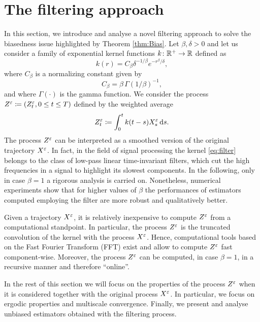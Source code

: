 \documentclass[10pt]{article}
\begin{document}
\section{The filtering approach}\label{sec:Filter}

In this section, we introduce and analyse a novel filtering approach to solve the biasedness issue highlighted by Theorem \ref{thm:Bias}. Let $\beta, \delta > 0$ and let us consider a family of exponential kernel functions $k \colon \mathbb{R}^+ \to \mathbb{R}$ defined as
\begin{equation}\label{eq:filter}
k(r) = C_\beta \delta^{-1/\beta} e^{-r^\beta/\delta},
\end{equation}
where $C_{\beta}$ is a normalizing constant given by
\begin{equation}
C_\beta = \beta \, \Gamma(1/\beta)^{-1},
\end{equation}
and where $\Gamma(\cdot)$ is the gamma function. We consider the process $Z^\varepsilon \coloneqq (Z^\varepsilon_t, 0 \leq t \leq T)$ defined by the weighted average
\begin{equation}\label{eq:ZDef}
	Z^{\varepsilon}_t \coloneqq \int_0^t k(t - s)X^\varepsilon_s \,\mathrm{d} s.
\end{equation}
The process $Z^\varepsilon$ can be interpreted as a smoothed version of the original trajectory $X^\varepsilon$. In fact, in the field of signal processing the kernel \eqref{eq:filter} belongs to the class of low-pass linear time-invariant filters, which cut the high frequencies in a signal to highlight its slowest components. In the following, only in case $\beta = 1$ a rigorous analysis is carried on. Nonetheless, numerical experiments show that for higher values of $\beta$ the performances of estimators computed employing the filter are more robust and qualitatively better. 

\begin{remark} Given a trajectory $X^\varepsilon$, it is relatively inexpensive to compute $Z^\varepsilon$ from a computational standpoint. In particular, the process $Z^\varepsilon$ is the truncated convolution of the kernel with the process $X^\varepsilon$. Hence, computational tools based on the Fast Fourier Transform (FFT) exist and allow to compute $Z^\varepsilon$ fast component-wise. Moreover, the process $Z^\varepsilon$ can be computed, in case $\beta = 1$, in a recursive manner and therefore ``online''.
\end{remark}

In the rest of this section we will focus on the properties of the process $Z^\varepsilon$ when it is considered together with the original process $X^\varepsilon$. In particular, we focus on ergodic properties and multiscale convergence. Finally, we present and analyse unbiased estimators obtained with the filtering process.
\end{document}
